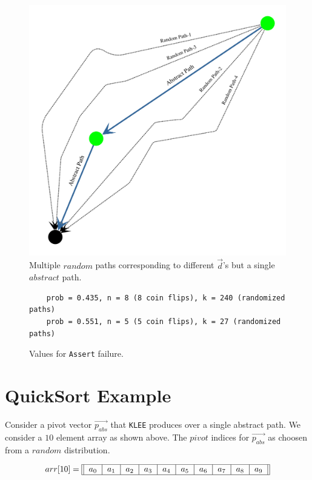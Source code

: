 \documentclass[usenames,dvipsnames,acmsmall]{acmart}
\begin{document}
\begin{figure}
	\centering
	\includegraphics[scale=0.16]{abstract.pdf}
	\caption{Multiple $random$ paths corresponding to different $\vec{d}$'s but a single $abstract$ path.}
\end{figure}

\begin{figure}
	\begin{verbatim}
	prob = 0.435, n = 8 (8 coin flips), k = 240 (randomized paths)
	prob = 0.551, n = 5 (5 coin flips), k = 27 (randomized paths) 
	\end{verbatim}
	\caption{Values for \texttt{Assert} failure.}
\end{figure}

\section{QuickSort Example}

Consider a pivot vector $\vec{p_{abs}}$ that \texttt{KLEE} produces over a single abstract path. We consider a $10$ element array as shown above. The $pivot$ indices for $\vec{p_{abs}}$ as choosen from a $random$ distribution.

\begin{equation}
	arr[10] = \begin{tabular}{||c|c|c|c|c|c|c|c|c|c||}
		\hline
		$a_0$ & $a_1$ & $a_2$ & $a_3$ & $a_4$ & $a_5$ & $a_6$ & $a_7$ & $a_8$ & $a_9$ \\
		\hline
	\end{tabular}
\end{equation} \\
\end{document}
